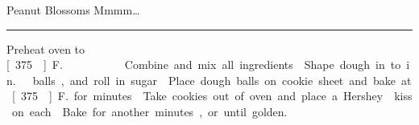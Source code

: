 \begin{recipe}{Peanut Blossoms}{}{}
\freeform Mmmm\ldots\\
\rule{\textwidth}{0.05pt}
\newstep Preheat oven to \unit[375\0]{F.}.
Combine and mix all ingredients.
\newstep Shape dough in to \unit[1]{in.}\ balls, and roll in sugar.
\newstep Place dough balls on cookie sheet and bake at \unit[375\0]{F.} for \unit[7--8]{minutes}.
Take cookies out of oven and place a Hershey\tm{} kiss on each.
\newstep Bake for another \unit[2--5]{minutes}, or until golden.
\end{recipe}
